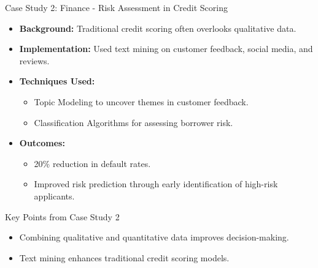 \documentclass[aspectratio=169]{beamer}
\begin{document}
\begin{frame}[fragile]{Case Study 2: Finance - Risk Assessment in Credit Scoring}
    \begin{itemize}
        \item \textbf{Background:} Traditional credit scoring often overlooks qualitative data.
        \item \textbf{Implementation:} Used text mining on customer feedback, social media, and reviews.
        \item \textbf{Techniques Used:} 
        \begin{itemize}
            \item Topic Modeling to uncover themes in customer feedback.
            \item Classification Algorithms for assessing borrower risk.
        \end{itemize}
        \item \textbf{Outcomes:} 
        \begin{itemize}
            \item 20\% reduction in default rates.
            \item Improved risk prediction through early identification of high-risk applicants.
        \end{itemize}
    \end{itemize}
\end{frame}

\begin{frame}[fragile]{Key Points from Case Study 2}
    \begin{itemize}
        \item Combining qualitative and quantitative data improves decision-making.
        \item Text mining enhances traditional credit scoring models.
    \end{itemize}
\end{frame}
\end{document}
